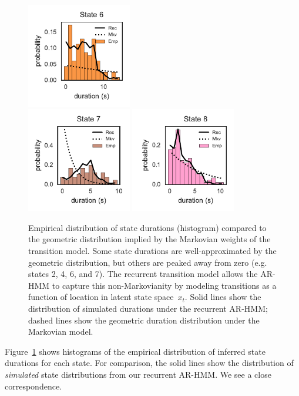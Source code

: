 \documentclass{article}
\begin{document}
\begin{figure}[h]
\includegraphics[width=1.8in]{figures/arhmm/durations_5.pdf}
\\
\includegraphics[width=1.8in]{figures/arhmm/durations_6.pdf}
\includegraphics[width=1.8in]{figures/arhmm/durations_7.pdf}
\caption{Empirical distribution of state durations (histogram)
  compared to the geometric distribution implied by the Markovian
  weights of the transition model.  Some state durations are
  well-approximated by the geometric distribution, but others
  are peaked away from zero (e.g. states 2, 4, 6, and 7).  The
  recurrent transition model allows the AR-HMM to capture this
  non-Markovianity by modeling transitions as a function of location
  in latent state space~$x_t$. Solid lines show the distribution
  of simulated durations under the recurrent AR-HMM; dashed lines
  show the geometric duration distribution under the Markovian model.}
\label{fig:durations}
\end{figure}

Figure~\ref{fig:durations} shows histograms of the
empirical distribution of inferred state durations for each state. For
comparison, the solid lines show the distribution of
\emph{simulated} state distributions from our recurrent AR-HMM.  We
see a close correspondence. 
\end{document}
